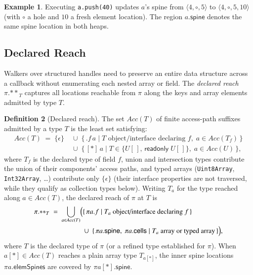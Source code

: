 \documentclass[10pt,a4paper]{article}
\theoremstyle{definition}
\newtheorem{definition}{Definition}
\newtheorem{example}[definition]{Example}
\newcommand{\kw}[1]{\mathsf{#1}}
\newcommand{\code}[1]{\textcolor{codec}{\texttt{#1}}}
\newcommand{\reach}[2]{#1.{\ast\ast}_{#2}}
\begin{document}
\begin{example}
Executing \code{a.push(40)} updates $a$'s spine from
$\langle 4,\circ,5\rangle$ to $\langle 4,\circ,5,10\rangle$ (with
$\circ$ a hole and $10$ a fresh element location). The region
$a.\kw{spine}$ denotes the same spine location in both heaps.
\end{example}

\subsection{Declared Reach}\label{sec:reach}

Walkers over structured handles need to preserve an entire data structure
across a callback without enumerating each nested array or field. The
\emph{declared reach} $\reach{\pi}{T}$ captures all locations reachable
from $\pi$ along the keys and array elements admitted by type $T$.

\begin{definition}[Declared reach]\label{def:reach}
The set $\mathit{Acc}(T)$ of finite access-path suffixes admitted by a
type $T$ is the least set satisfying:
\begin{align*}
\mathit{Acc}(T) \;=\; \{\epsilon\}
  &\;\cup\; \{\,.f\,a \mid T\text{ object/interface declaring }f,\; a\in\mathit{Acc}(T_f)\,\}\\
  &\;\cup\; \{\,[\ast]\,a \mid T\in\{U[\,],\,\kw{readonly}\;U[\,]\},\; a\in\mathit{Acc}(U)\,\},
\end{align*}
where $T_f$ is the declared type of field $f$, union and intersection
types contribute the union of their components' access paths, and typed
arrays (\code{Uint8Array}, \code{Int32Array}, \dots) contribute only
$\{\epsilon\}$ (their interface properties are not traversed, while they
qualify as collection types below). Writing $T_a$ for the type reached
along $a\in\mathit{Acc}(T)$, the declared reach of $\pi$ at $T$ is
\begin{align*}
\reach{\pi}{T}\;=\;\bigcup_{a\in\mathit{Acc}(T)}\Bigl(
  &\{\,\pi a.f\mid T_a\text{ object/interface declaring }f\,\}\\
  &\cup\;\{\,\pi a.\kw{spine},\;\pi a.\kw{cells}\mid T_a\text{ array or typed array}\,\}\Bigr),
\end{align*}
where $T$ is the declared type of $\pi$ (or a refined type established
for $\pi$). When $a[\ast]\in\mathit{Acc}(T)$ reaches a plain array type
$T_{a[\ast]}$, the inner spine locations $\pi a.\kw{elemSpines}$ are
covered by $\pi a[\ast].\kw{spine}$.
\end{definition}
\end{document}
